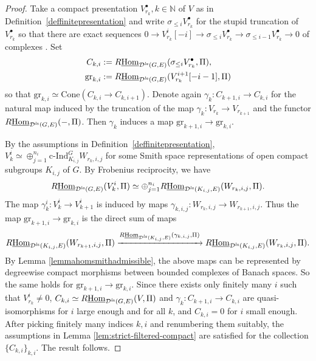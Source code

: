 \documentclass[a4paper,10pt]{amsart}
\theoremstyle{remark}
\theoremstyle{definition}
\theoremstyle{plain}
\numberwithin{equation}{section}
\newcommand{\bbN}{{\mathbb N}}
\newcommand{\calD}{{\mathcal D}}
\newcommand{\Hom}{{\rm Hom}}
\newcommand{\la}{{\it la}}
\newcommand{\cInd}{\mathrm{c\text{-}Ind}}
\newcommand{\Cone}{\mathrm{Cone}}
\begin{document}
\begin{proof}
Take a compact presentation 
$V_{r_k}^\bullet,k\in\bbN$ of $V$ as in Definition~\ref{deffinitepresentation} and write $\sigma_{\leq i}V_{r_k}^\bullet$ for the stupid truncation of $V_{r_k}^{\bullet}$ so that there are exact sequences $0\rightarrow V_{r_k}^i[-i]\rightarrow \sigma_{\leq i}V_{r_k}^{\bullet}\rightarrow \sigma_{\leq i-1}V_{r_k}^{\bullet}\rightarrow 0$ of complexes \cite[\href{https://stacks.math.columbia.edu/tag/0118}{Tag 0118}]{stacks-project}. Set 
\begin{equation}
	\begin{aligned}
		C_{k,i}&:=R\underline{\Hom}_{\calD^{\la}(G,E)}(\sigma_{\leq i}V_{r_k}^\bullet,\Pi),\\
		\mathrm{gr}_{k,i}&:=R\underline{\Hom}_{\calD^{\la}(G,E)}(V_{r_k}^{i+1}[-i-1],\Pi)
	\end{aligned}
\end{equation}
so that $\mathrm{gr}_{k,i}\simeq \Cone(C_{k,i}\rightarrow C_{k,i+1})$. Denote again $\gamma_k: C_{k+1,i}\rightarrow C_{k,i}$ for the natural map induced by the truncation of the map $\gamma_k: V_{r_k}\rightarrow V_{r_{k+1}}$ and the functor $R\underline{\Hom}_{\calD^{\la}(G,E)}(-,\Pi)$. Then $\gamma_k$ induces a map $\mathrm{gr}_{k+1,i}\rightarrow \mathrm{gr}_{k,i}$. 

By the assumptions in Definition~\ref{deffinitepresentation}, $V_{k}^i\simeq \oplus_{j=1}^{n_i}\cInd_{K_{i,j}}^{G}W_{r_k,i,j}$ for some Smith space representations of open compact subgroups $K_{i,j}$ of $G$. By Frobenius reciprocity, we have 
\[R\underline{\Hom}_{\calD^{\la}(G,E)}(V_{k}^i,\Pi)\simeq \oplus_{j=1}^{n_i}R\underline{\Hom}_{\calD^{\la}(K_{i,j},E)}(W_{r_k,i,j},\Pi).\]
The map $\gamma_k^i:V_{k}^i\rightarrow V_{k+1}^i$ is induced by maps $\gamma_{k,i,j}:W_{r_k,i,j}\rightarrow W_{r_{k+1},i,j}$. Thus the map $\mathrm{gr}_{k+1,i}\rightarrow \mathrm{gr}_{k,i}$ is the direct sum of maps 
\[R\underline{\Hom}_{\calD^{\la}(K_{i,j},E)}(W_{r_{k+1},i,j},\Pi)\xrightarrow{R\underline{\Hom}_{\calD^{\la}(K_{i,j},E)}(\gamma_{k,i,j},\Pi)} R\underline{\Hom}_{\calD^{\la}(K_{i,j},E)}(W_{r_{k},i,j},\Pi).\] 
By Lemma \ref{lemmahomsmithadmissible}, the above maps can be represented by degreewise compact morphisms between bounded complexes of Banach spaces. So the same holds for $\mathrm{gr}_{k+1,i}\rightarrow \mathrm{gr}_{k,i}$. Since there exists only finitely many $i$ such that $V_{r_k}^i\neq 0$, $C_{k,i}\simeq R\underline{\Hom}_{\calD^{\la}(G,E)}(V,\Pi)$ and $\gamma_{k}: C_{k+1,i}\rightarrow C_{k,i}$ are quasi-isomorphisms for $i$ large enough and for all $k$, and $C_{k,i}=0$ for $i$ small enough. After picking finitely many indices $k, i$ and renumbering them suitably, the assumptions in Lemma \ref{lem:strict-filtered-compact} are satisfied for the collection $\{C_{k,i}\}_{k,i}$. The result follows.
\end{proof}
\end{document}
